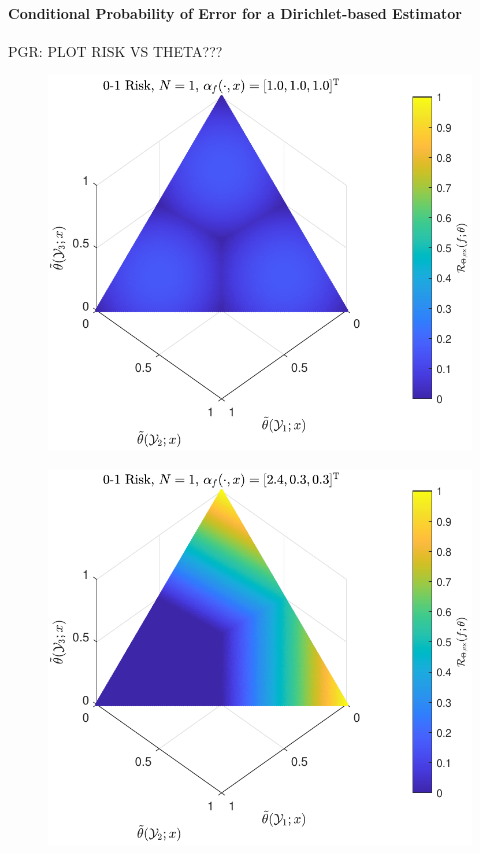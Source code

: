 \documentclass[12pt]{article}
\begin{document}
\paragraph{Conditional Probability of Error for a Dirichlet-based Estimator}

PGR: PLOT RISK VS THETA???

\begin{figure}
\centering
\includegraphics[width=0.7\linewidth]{Risk_cond_ex_01_Dir_theta__uni.pdf}
\label{fig:Risk_cond_ex_01_Dir_theta__uni}
\end{figure}

\begin{figure}
\centering
\includegraphics[width=0.7\linewidth]{Risk_cond_ex_01_Dir_theta__subj.pdf}
\label{fig:Risk_cond_ex_01_Dir_theta__subj}
\end{figure}
\end{document}

